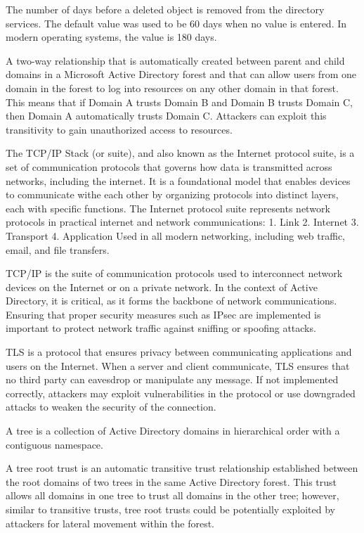  The number of days before a deleted object is removed from the directory services. The default value was used to be 60 days when no value is entered. In modern operating systems, the value is 180 days.

 A two-way relationship that is automatically created between parent and child domains in a Microsoft Active Directory forest and that can allow users from one domain in the forest to log into resources on any other domain in that forest. This means that if Domain A trusts Domain B and Domain B trusts Domain C, then Domain A automatically trusts Domain C. Attackers can exploit this transitivity to gain unauthorized access to resources.

 The TCP/IP Stack (or suite), and also known as the Internet protocol suite, is a set of communication protocols that governs how data is transmitted across networks, including the internet. It is a foundational model that enables devices to communicate withe each other by organizing protocols into distinct layers, each with specific functions. The Internet protocol suite represents network protocols in practical internet and network communications:
1. Link
2. Internet
3. Transport
4. Application
Used in all modern networking, including web traffic, email, and file transfers.

 TCP/IP is the suite of communication protocols used to interconnect network devices on the Internet or on a private network. In the context of Active Directory, it is critical, as it forms the backbone of network communications. Ensuring that proper security measures such as IPsec are implemented is important to protect network traffic against sniffing or spoofing attacks.

 TLS is a protocol that ensures privacy between communicating applications and users on the Internet. When a server and client communicate, TLS ensures that no third party can eavesdrop or manipulate any message. If not implemented correctly, attackers may exploit vulnerabilities in the protocol or use downgraded attacks to weaken the security of the connection.

 A tree is a collection of Active Directory domains in hierarchical order with a contiguous namespace.

 A tree root trust is an automatic transitive trust relationship established between the root domains of two trees in the same Active Directory forest. This trust allows all domains in one tree to trust all domains in the other tree; however, similar to transitive trusts, tree root trusts could be potentially exploited by attackers for lateral movement within the forest.

